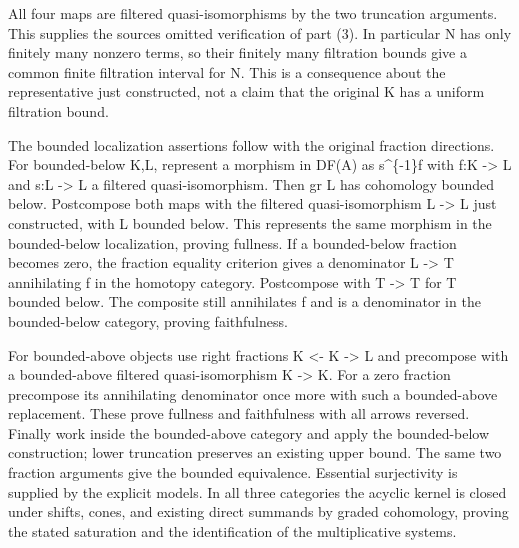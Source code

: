 All four maps are filtered quasi-isomorphisms by the two truncation arguments. This supplies the source\textquotesingle s omitted verification of part (3)\allowbreak{}. In particular N has only finitely many nonzero terms,\allowbreak{} so their finitely many filtration bounds give a common finite filtration interval for N. This is a consequence about the representative just constructed,\allowbreak{} not a claim that the original K has a uniform filtration bound.

The bounded localization assertions follow with the original fraction directions. For bounded-below K,\allowbreak{}L,\allowbreak{} represent a morphism in DF(A)\allowbreak{} as s\^{}\{-1\}f with f:\allowbreak{}K \allowbreak{}-> L\textquotesingle{} and s:\allowbreak{}L \allowbreak{}-> L\textquotesingle{} a filtered quasi-isomorphism. Then gr L\textquotesingle{} has cohomology bounded below. Postcompose both maps with the filtered quasi-isomorphism L\textquotesingle{} \allowbreak{}-> L\textquotesingle\textquotesingle{} just constructed,\allowbreak{} with L\textquotesingle\textquotesingle{} bounded below. This represents the same morphism in the bounded-below localization,\allowbreak{} proving fullness. If a bounded-below fraction becomes zero,\allowbreak{} the fraction equality criterion gives a denominator L\textquotesingle{} \allowbreak{}-> T annihilating f in the homotopy category. Postcompose with T \allowbreak{}-> T\textquotesingle{} for T\textquotesingle{} bounded below. The composite still annihilates f and is a denominator in the bounded-below category,\allowbreak{} proving faithfulness.

For bounded-above objects use right fractions K \textless- K\textquotesingle{} \allowbreak{}-> L and precompose with a bounded-above filtered quasi-isomorphism K\textquotesingle\textquotesingle{} \allowbreak{}-> K\textquotesingle. For a zero fraction precompose its annihilating denominator once more with such a bounded-above replacement. These prove fullness and faithfulness with all arrows reversed. Finally work inside the bounded-above category and apply the bounded-below construction; lower truncation preserves an existing upper bound. The same two fraction arguments give the bounded equivalence. Essential surjectivity is supplied by the explicit models. In all three categories the acyclic kernel is closed under shifts,\allowbreak{} cones,\allowbreak{} and existing direct summands by graded cohomology,\allowbreak{} proving the stated saturation and the identification of the multiplicative systems.

